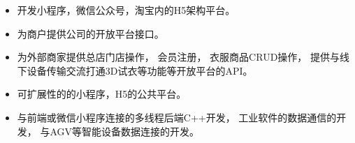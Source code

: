 \documentclass{resume}
\begin{document}
\begin{itemize}[parsep=0。2ex]
  \item 开发小程序，微信公众号，淘宝内的H5架构平台。
  \item 为商户提供公司的开放平台接口。
  \item 为外部商家提供总店门店操作， 会员注册， 衣服商品CRUD操作， 提供与线下设备传输交流打通3D试衣等功能等开放平台的API。
  \item 可扩展性的的小程序，H5的公共平台。
\end{itemize}

\begin{itemize}[parsep=0。2ex]
  \item 与前端或微信小程序连接的多线程后端C++开发， 工业软件的数据通信的开发， 与AGV等智能设备数据连接的开发。
\end{itemize}
\end{document}
